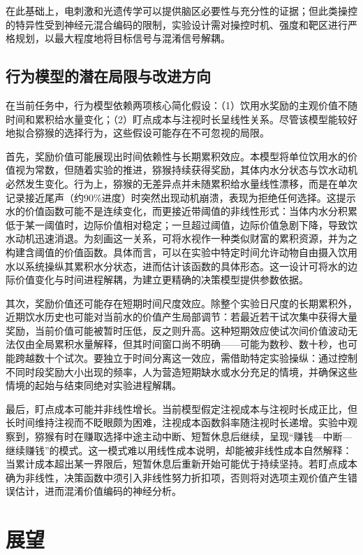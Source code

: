 在此基础上，电刺激和光遗传学可以提供脑区必要性与充分性的证据；但此类操控的特异性受到神经元混合编码的限制，实验设计需对操控时机、强度和靶区进行严格规划，以最大程度地将目标信号与混淆信号解耦。

\subsection{行为模型的潜在局限与改进方向}\label{chap4_2_13:model}

在当前任务中，行为模型依赖两项核心简化假设：（1）饮用水奖励的主观价值不随时间和累积给水量变化；（2）盯点成本与注视时长呈线性关系。尽管该模型能较好地拟合猕猴的选择行为，这些假设可能存在不可忽视的局限。

首先，奖励价值可能展现出时间依赖性与长期累积效应。本模型将单位饮用水的价值视为常数，但随着实验的推进，猕猴持续获得奖励，其体内水分状态与饮水动机必然发生变化。行为上，猕猴的无差异点并未随累积给水量线性漂移，而是在单次记录接近尾声（约90\%进度）时突然出现动机崩溃，表现为拒绝任何选择。这提示水的价值函数可能不是连续变化，而更接近带阈值的非线性形式：当体内水分积累低于某一阈值时，边际价值相对稳定；一旦超过阈值，边际价值急剧下降，导致饮水动机迅速消退。为刻画这一关系，可将水视作一种类似财富的累积资源，并为之构建含阈值的价值函数。具体而言，可以在实验中特定时间允许动物自由摄入饮用水以系统操纵其累积水分状态，进而估计该函数的具体形态。这一设计可将水的边际价值变化与时间进程解耦，为建立更精确的决策模型提供参数依据。

其次，奖励价值还可能存在短期时间尺度效应。除整个实验日尺度的长期累积外，近期饮水历史也可能对当前水的价值产生局部调节：若最近若干试次集中获得大量奖励，当前价值可能被暂时压低，反之则升高。这种短期效应使试次间价值波动无法仅由全局累积水量解释，但其时间窗口尚不明确——可能为数秒、数十秒，也可能跨越数十个试次。要独立于时间分离这一效应，需借助特定实验操纵：通过控制不同时段奖励大小出现的频率，人为营造短期缺水或水分充足的情境，并确保这些情境的起始与结束同绝对实验进程解耦。

最后，盯点成本可能并非线性增长。当前模型假定注视成本与注视时长成正比，但长时间维持注视而不眨眼颇为困难，注视成本函数斜率随注视时长递增。实验中观察到，猕猴有时在赚取选择中途主动中断、短暂休息后继续，呈现“赚钱---中断---继续赚钱”的模式。这一模式难以用线性成本说明，却能被非线性成本自然解释：当累计成本超出某一界限后，短暂休息后重新开始可能优于持续坚持。若盯点成本确为非线性，决策函数中须引入非线性努力折扣项，否则将对选项主观价值产生错误估计，进而混淆价值编码的神经分析。

\section{展望}\label{chap4_3:future}

